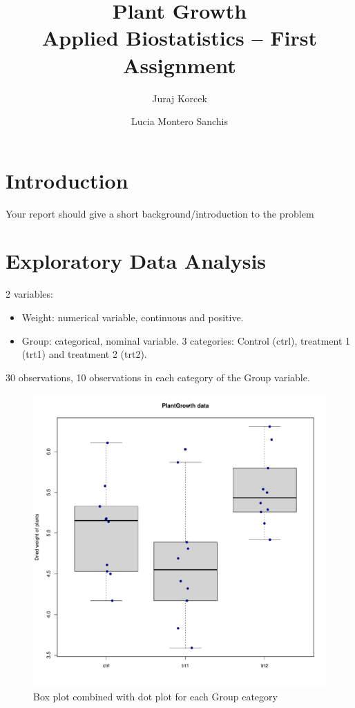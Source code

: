 \documentclass{article}
\begin{document}


\title{Plant Growth \\[15pt] \large{Applied Biostatistics -- First Assignment}}
\author{Juraj Korcek \and Lucia Montero Sanchis}
\maketitle

\section{Introduction}

Your report should give a short background/introduction to the problem



\section{Exploratory Data Analysis}
2 variables:
\begin{itemize}
    \item Weight: numerical variable, continuous and positive. 
    \item Group: categorical, nominal variable. 3 categories: Control (ctrl), treatment 1 (trt1) and treatment 2 (trt2).
\end{itemize}

30 observations, 10 observations in each category of the Group variable.

\begin{figure}\label{figure:boxplots}
\begin{center}
\includegraphics{sample-001}
\caption{Box plot combined with dot plot for each Group category}
\end{center}
\end{figure}
\end{document}
